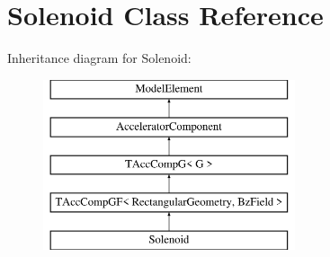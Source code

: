\hypertarget{classSolenoid}{}\section{Solenoid Class Reference}
\label{classSolenoid}
Inheritance diagram for Solenoid\+:\begin{figure}[H]
\begin{center}
\leavevmode
\includegraphics[height=5.000000cm]{classSolenoid}
\end{center}
\end{figure}
